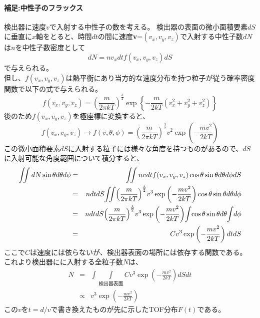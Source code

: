 \paragraph{補足:中性子のフラックス} 
検出器に速度$v$で入射する中性子の数を考える。
検出器の表面の微小面積要素$dS$に垂直に$x$軸をとると、時間$dt$の間に速度{\bf v}=$(v_x,v_y,v_z)$で入射する中性子数$dN$は$n$を中性子数密度として
\begin{equation}
dN=nv_xdtf(v_x,v_y,v_z)dS
\end{equation}
で与えられる。\\
但し、$f(v_x,v_y,v_z)$は熱平衡にあり当方的な速度分布を持つ粒子が従う確率密度関数で以下の式で与えられる。
\begin{equation}
f(v_x,v_y,v_z)={\left(\frac{m}{2\pi kT}\right)}^{\frac{3}{2}}\exp\left\{-\frac{m}{2kT}(v^2_x+v^2_y+v^2_z)\right\} 
\end{equation}
後のため$f(v_x,v_y,v_z)$を極座標に変換すると、
\begin{equation}
f(v_x,v_y,v_z) \rightarrow f(v,\theta,\phi)={\left(\frac{m}{2\pi kT}\right)}^{\frac{3}{2}}v^2\exp\left(-\frac{mv^2}{2kT}\right)
\end{equation}
この微小面積要素$dS$に入射する粒子には様々な角度を持つものがあるので、$dS$に入射可能な角度範囲について積分すると、
\begin{eqnarray*}
 \iint dN\sin\theta d\theta d\phi &=&\iint nvdtf(v_x,v_y,v_z)\cos\theta \sin\theta d\theta d\phi dS \\ 
&=&ndtdS \hspace{-2pt}\iint \hspace{-2pt}{\left(\frac{m}{2\pi kT}\right)}^{\frac{3}{2}}v^3\exp\left(-\frac{mv^2}{2kT}\right)\cos\theta \sin\theta d\theta d\phi  \\
&=&ndtdS{\left(\frac{m}{2\pi kT}\right)}^{\frac{3}{2}} v^3\exp\left(-\frac{mv^2}{2kT}\right) \hspace{-2pt}\int \hspace{-2pt}\cos\theta\sin\theta d\theta \hspace{-2pt}\int \hspace{-2pt} d\phi \\
&=&Cv^3\exp\left(-\frac{mv^2}{2kT}\right)dtdS
\end{eqnarray*}
ここで$C$は速度には依らないが、検出器表面の場所には依存する関数である。\\
これより検出器にに入射する全粒子数$N$は、
\begin{eqnarray*}
N &=&
\int\int\limits_{\text{} 検出器表面}Cv^3\exp\left(-\frac{mv^2}{2kT}\right)dSdt \\
&\propto& v^3\exp\left(-\frac{mv^2}{2kT}\right)
\end{eqnarray*}
この$v$を$t=d/v$で書き換えたものが先に示したTOF分布$F(t)$である。
\newpage

